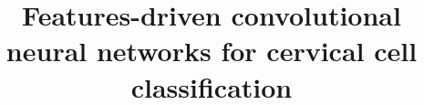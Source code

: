 \documentclass{bmcart}
\begin{document}
\begin{frontmatter}

\begin{fmbox}


\title{Features-driven convolutional neural networks for cervical cell classification}


\author[
   addressref={aff1,aff2},                   %
   corref={aff1},                       %
   email={jtello@itslerdo.edu.mx}   %
]{ }
\author[
   addressref={aff2},
   email={j.bescos@uam.es}
]{ }
\author[
   addressref={aff3},
   email={francisco.floresgarcia@gmail.com}
]{ }


\end{fmbox}
\end{frontmatter}
\end{document}

